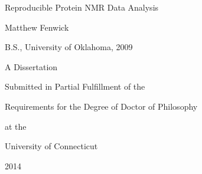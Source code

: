 \begin{titlepage}
  \begin{center}

  {\huge Reproducible Protein NMR Data Analysis}

    \large

    \vspace{1cm}

    Matthew Fenwick

    \vspace{1in}

    B.S., University of Oklahoma, 2009

    \vfill

    A Dissertation 

    Submitted in Partial Fulfillment of the 

    Requirements for the Degree of Doctor of Philosophy 

    at the 

    University of Connecticut 

    \vspace{1cm}

    2014
  \end{center}
\end{titlepage}

